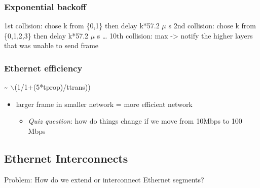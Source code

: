 \documentclass[11pt]{article}
\begin{document}
\subsubsection{Exponential backoff}
\label{sec:orgheadline40}
1st collision: chose k from \{0,1\} then delay k*57.2 \(\mu\) s
2nd collision: chose k from \{0,1,2,3\} then delay k*57.2 \(\mu\) s
\ldots{}
10th collision: max -> notify the higher layers that was unable to send frame

\subsubsection{Ethernet efficiency}
\label{sec:orgheadline41}
\textasciitilde{} $\backslash$(1/1+(5*tprop)/ttrans))
\begin{itemize}
\item larger frame in smaller network = more efficient network

\begin{itemize}
\item \emph{Quiz question}: how do things change if we move from 10Mbps to 100 Mbps
\end{itemize}
\end{itemize}


\subsection{Ethernet Interconnects}
\label{sec:orgheadline44}
Problem: How do we extend or interconnect Ethernet segments?
\end{document}
